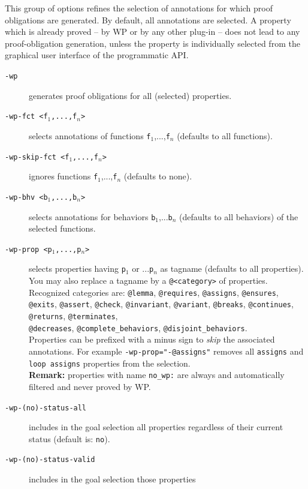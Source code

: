 This group of options refines the selection of annotations for which
proof obligations are generated. By default, all annotations are
selected. A property which is already proved -- by \textsf{WP} or by
any other plug-in -- does not lead to any proof-obligation generation,
unless the property is individually selected from the graphical user
interface of the programmatic API.

\begin{description}
\item [\tt -wp] generates proof obligations for all (selected) properties.
\item [\tt -wp-fct <f$_1$,...,f$_n$>] selects annotations of functions
  \texttt{f$_1$},...,\texttt{f$_n$} (defaults to all functions).
\item [\tt -wp-skip-fct <f$_1$,...,f$_n$>] ignores
  functions \texttt{f$_1$},...,\texttt{f$_n$} (defaults to none).
\item [\tt -wp-bhv <b$_1$,...,b$_n$>] selects annotations for behaviors
  \texttt{b$_1$},...\texttt{b$_n$} (defaults to all behaviors) of the
  selected functions.
\item [\tt -wp-prop <p$_1$,...,p$_n$>] selects properties having
  \texttt{p$_1$} or ...\texttt{p$_n$} as tagname (defaults to all
  properties). You may also replace a tagname by a
    \texttt{@<category>} of properties.
    \\
    Recognized categories are: \texttt{@lemma}, \texttt{@requires}, \texttt{@assigns},
    \texttt{@ensures}, \texttt{@exits}, \texttt{@assert}, \texttt{@check},
    \texttt{@invariant}, \texttt{@variant}, \texttt{@breaks},
    \texttt{@continues}, \texttt{@returns}, \texttt{@terminates},\\
    \texttt{@decreases},
    \texttt{\mbox{@complete\_behaviors}}, \texttt{\mbox{@disjoint\_behaviors}}.
    \\
    Properties can be prefixed with a minus sign to \emph{skip} the associated annotations.
    For example \texttt{-wp-prop="-@assigns"} removes all \texttt{assigns}
    and \texttt{loop assigns} properties from the selection.
    \\
    \textbf{Remark:} properties with name \verb+no_wp:+ are always and automatically
    filtered and never proved by \textsf{WP}.
\item [\tt -wp-(no)-status-all] includes in the goal selection all properties
  regardless of their current status (default is: \texttt{no}).
\item [\tt -wp-(no)-status-valid] includes in the goal selection those properties

\end{description}
